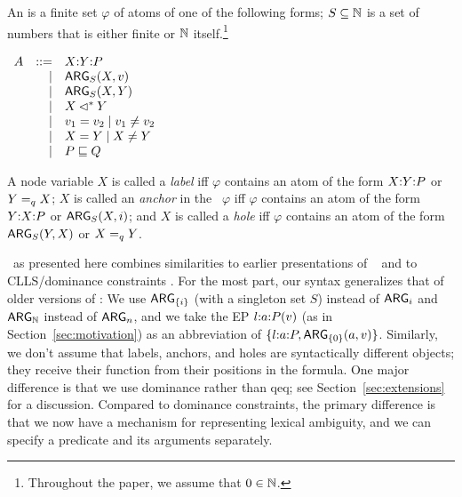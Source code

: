 \begin{definition}\label{defn:rmrs-syntax}
  An \emph{\rmrs} is a finite set $\varphi$ of atoms of one of the
  following forms; $S \subseteq \mathbb{N}$ is a set of numbers that is either
  finite or $\mathbb{N}$ itself.\footnote{Throughout the paper, we assume that
    $0 \in \mathbb{N}$.}

$\begin{array}{rrll}
A &::= &\ep{X}{Y}{P} \\ %
&| &\ARG_S(X,v) \\ %
&| &\ARG_S(X,Y) \\ %
&| &X \dom Y \\ %
&| &v_1 = v_2 \;|\; v_1 \neq v_2 \\ %
&| &X = Y \;|\; X \neq Y \\ %
&| &P \spec Q %
\end{array}
$

A node variable $X$ is called a \emph{label} iff $\varphi$ contains an
atom of the form $X {:} Y {:} P$ or $Y =_q X$; $X$ is called an
\emph{anchor} in the \rmrs\ $\varphi$ iff $\varphi$ contains an atom
of the form $Y {:} X {:} P$ or $\mathsf{ARG}_S(X,i)$; and $X$ is called a
\emph{hole} iff $\varphi$ contains an atom of the form $\mathsf{ARG}_S(Y,X)$
or $X =_q Y$.
\end{definition}

\rmrs\ as presented here combines similarities to earlier
presentations of \rmrs\ \cite{copestake:2003,copestake:2007b} and to
CLLS/dominance constraints \cite{egg:etal:2001}.  For the most part,
our syntax generalizes that of older versions of \rmrs: We use
$\mathsf{ARG}_{\{i\}}$ (with a singleton set $S$) instead of $\mathsf{ARG}_i$ and
$\mathsf{ARG}_{\mathbb{N}}$ instead of $\mathsf{ARG}_n$, and we take the EP $l {:} a {:} P(v)$
(as in Section~\ref{sec:motivation}) as an abbreviation of
$\{l {:} a {:} P, \mathsf{ARG}_{\{0\}}(a,v)\}$.  Similarly, we don't assume
that labels, anchors, and holes are syntactically different objects;
they receive their function from their positions in the formula.  One
major difference is that we use dominance rather than qeq; see
Section~\ref{sec:extensions} for a discussion.  Compared to dominance
constraints, the primary difference is that we now have a mechanism
for representing lexical ambiguity, and we can specify a predicate and
its arguments separately.


